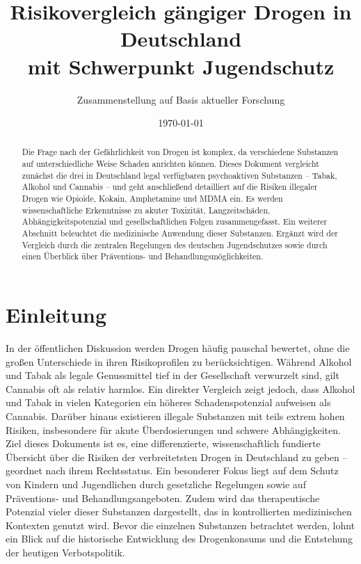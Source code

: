 \documentclass[11pt,a4paper]{article}
\title{Risikovergleich gängiger Drogen in Deutschland \\ mit Schwerpunkt Jugendschutz}
\author{Zusammenstellung auf Basis aktueller Forschung}
\date{\today}
\begin{document}
	
	\maketitle
	
	\begin{abstract}
		Die Frage nach der Gefährlichkeit von Drogen ist komplex, da verschiedene Substanzen auf unterschiedliche Weise Schaden anrichten können. Dieses Dokument vergleicht zunächst die drei in Deutschland legal verfügbaren psychoaktiven Substanzen – Tabak, Alkohol und Cannabis – und geht anschließend detailliert auf die Risiken illegaler Drogen wie Opioide, Kokain, Amphetamine und MDMA ein. Es werden wissenschaftliche Erkenntnisse zu akuter Toxizität, Langzeitschäden, Abhängigkeitspotenzial und gesellschaftlichen Folgen zusammengefasst. Ein weiterer Abschnitt beleuchtet die medizinische Anwendung dieser Substanzen. Ergänzt wird der Vergleich durch die zentralen Regelungen des deutschen Jugendschutzes sowie durch einen Überblick über Präventions- und Behandlungsmöglichkeiten.
	\end{abstract}
	
	\section{Einleitung}
	
	In der öffentlichen Diskussion werden Drogen häufig pauschal bewertet, ohne die großen Unterschiede in ihren Risikoprofilen zu berücksichtigen. Während Alkohol und Tabak als legale Genussmittel tief in der Gesellschaft verwurzelt sind, gilt Cannabis oft als relativ harmlos. Ein direkter Vergleich zeigt jedoch, dass Alkohol und Tabak in vielen Kategorien ein höheres Schadenspotenzial aufweisen als Cannabis. Darüber hinaus existieren illegale Substanzen mit teils extrem hohen Risiken, insbesondere für akute Überdosierungen und schwere Abhängigkeiten. Ziel dieses Dokuments ist es, eine differenzierte, wissenschaftlich fundierte Übersicht über die Risiken der verbreitetsten Drogen in Deutschland zu geben – geordnet nach ihrem Rechtsstatus. Ein besonderer Fokus liegt auf dem Schutz von Kindern und Jugendlichen durch gesetzliche Regelungen sowie auf Präventions- und Behandlungsangeboten. Zudem wird das therapeutische Potenzial vieler dieser Substanzen dargestellt, das in kontrollierten medizinischen Kontexten genutzt wird. Bevor die einzelnen Substanzen betrachtet werden, lohnt ein Blick auf die historische Entwicklung des Drogenkonsums und die Entstehung der heutigen Verbotspolitik.
	
\end{document}
